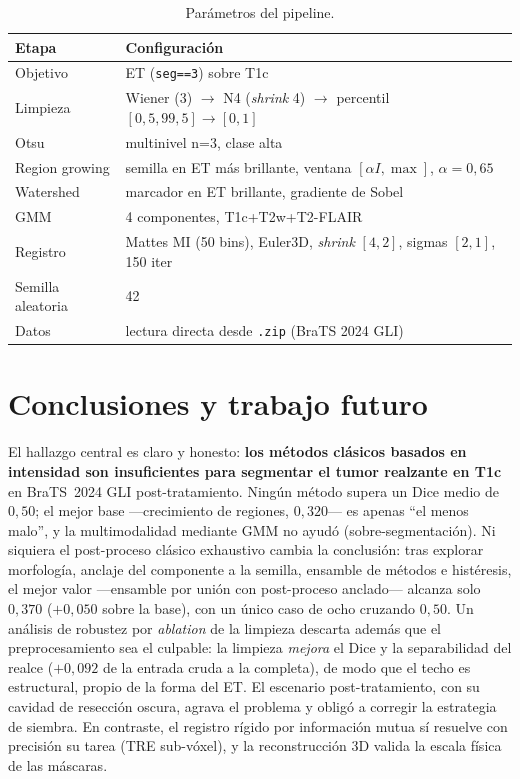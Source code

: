 \documentclass[conference]{IEEEtran}
\begin{document}
\begin{table}[h]
\centering
\caption{Parámetros del pipeline.}
\label{tab:repro}
\begin{tabularx}{\columnwidth}{lX}
\toprule
Etapa & Configuración \\
\midrule
Objetivo & ET (\texttt{seg==3}) sobre T1c \\
Limpieza & Wiener (3) $\to$ N4 (\textit{shrink} 4) $\to$ percentil $[0{,}5,99{,}5]\to[0,1]$ \\
Otsu & multinivel n=3, clase alta \\
Region growing & semilla en ET más brillante, ventana $[\alpha I,\max]$, $\alpha=0{,}65$ \\
Watershed & marcador en ET brillante, gradiente de Sobel \\
GMM & 4 componentes, T1c+T2w+T2-FLAIR \\
Registro & Mattes MI (50 bins), Euler3D, \textit{shrink} $[4,2]$, sigmas $[2,1]$, 150 iter \\
Semilla aleatoria & 42 \\
Datos & lectura directa desde \texttt{.zip} (BraTS 2024 GLI) \\
\bottomrule
\end{tabularx}
\end{table}

\section{Conclusiones y trabajo futuro}
El hallazgo central es claro y honesto: \textbf{los métodos
clásicos basados en intensidad son insuficientes para segmentar el
tumor realzante en T1c} en BraTS~2024 GLI post-tratamiento. Ningún
método supera un Dice medio de $0{,}50$; el mejor base ---crecimiento de
regiones, $0{,}320$--- es apenas ``el menos malo'', y la
multimodalidad mediante GMM no ayudó (sobre-segmentación). Ni
siquiera el post-proceso clásico exhaustivo cambia la conclusión:
tras explorar morfología, anclaje del componente a la semilla,
ensamble de métodos e histéresis, el mejor valor ---ensamble por
unión con post-proceso anclado--- alcanza solo $0{,}370$
($+0{,}050$ sobre la base), con un único caso de ocho cruzando
$0{,}50$. Un análisis de robustez por \emph{ablation} de la limpieza
descarta además que el preprocesamiento sea el culpable: la limpieza
\emph{mejora} el Dice y la separabilidad del realce ($+0{,}092$ de
la entrada cruda a la completa), de modo que el techo es estructural,
propio de la forma del ET. El
escenario post-tratamiento, con su cavidad de resección oscura,
agrava el problema y obligó a corregir la estrategia de siembra. En
contraste, el registro rígido por información mutua sí resuelve con
precisión su tarea (TRE sub-vóxel), y la reconstrucción 3D valida
la escala física de las máscaras.
\end{document}
